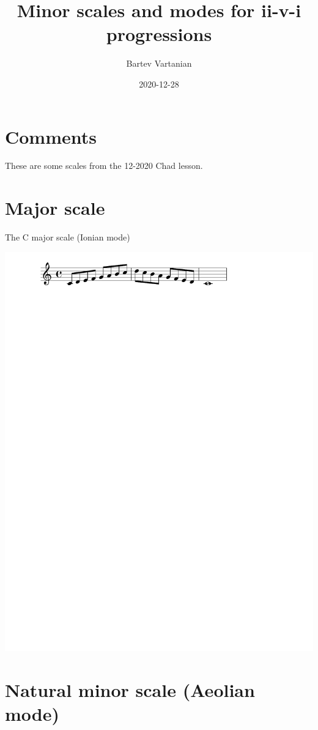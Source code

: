 \documentclass[11pt]{article}
\author{Bartev Vartanian}
\date{2020-12-28}
\title{Minor scales and modes for ii-v-i progressions}
\begin{document}
\maketitle

\section*{Comments}
\label{sec:org271aaef}

These are some scales from the 12-2020 Chad lesson.

\section*{Major scale}
\label{sec:org7ca44aa}

The C major scale (Ionian mode)

\begin{center}
\includegraphics[width=.9\linewidth]{c_major.pdf}
\end{center}

\section*{Natural minor scale (Aeolian mode)}
\label{sec:orgf11dfcb}
\end{document}
